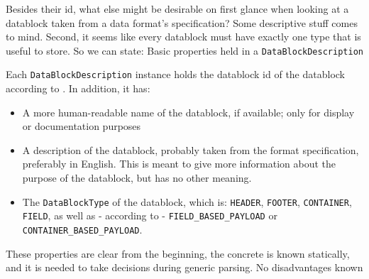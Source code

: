 Besides their id, what else might be desirable on first glance when looking at a datablock taken from a data format's specification? Some descriptive stuff comes to mind. Second, it seems like every datablock must have exactly one type that is useful to store. So we can state:
{%
Basic properties held in a \texttt{DataBlockDescription}
}
{%
Each \texttt{DataBlockDescription} instance holds the datablock id of the datablock according to . In addition, it has:
\begin{itemize}
\item A more human-readable name of the datablock, if available; only for display or documentation purposes
\item A description of the datablock, probably taken from the format specification, preferably in English. This is meant to give more information about the purpose of the datablock, but has no other meaning.
\item The \texttt{DataBlockType} of the datablock, which is: \texttt{HEADER}, \texttt{FOOTER}, \texttt{CONTAINER}, \texttt{FIELD}, as well as \-- according to  \-- \texttt{FIELD\_BASED\_PAYLOAD} or \texttt{CONTAINER\_BASED\_PAYLOAD}.
\end{itemize}
}
{%
These properties are clear from the beginning, the concrete is known statically, and it is needed to take decisions during generic parsing. 
}
{%
No disadvantages known
}
 
